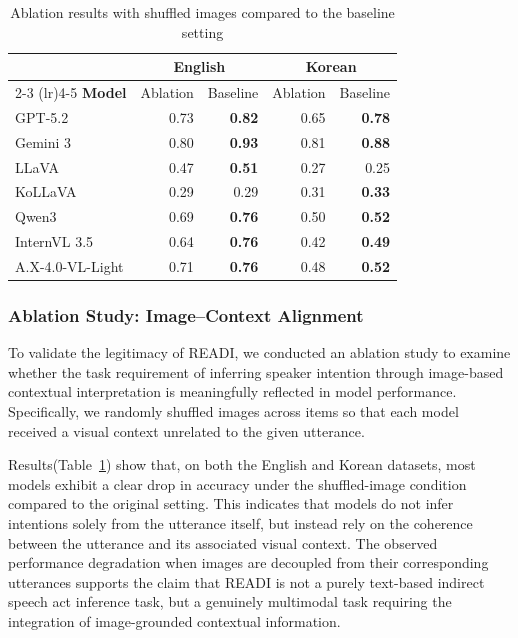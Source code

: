 \documentclass[11pt]{article}
\begin{document}
\begin{table}[t]
\centering
\small
\setlength{\tabcolsep}{3pt}          %
\renewcommand{\arraystretch}{0.95}
\begin{tabular}{p{2.4cm}rrrr}        %
\toprule
& \multicolumn{2}{c}{\textbf{English}} & \multicolumn{2}{c}{\textbf{Korean}} \\
\cmidrule(lr){2-3} \cmidrule(lr){4-5}
\textbf{Model} & Ablation & Baseline & Ablation & Baseline \\
\midrule
GPT-5.2               & 0.73 & \textbf{0.82} & 0.65 & \textbf{0.78} \\
Gemini 3             & 0.80 & \textbf{0.93} & 0.81 & \textbf{0.88} \\
LLaVA                & 0.47 & \textbf{0.51} & 0.27 & 0.25 \\
KoLLaVA              & 0.29 & 0.29           & 0.31 & \textbf{0.33} \\
Qwen3                & 0.69 & \textbf{0.76} & 0.50 & \textbf{0.52} \\
InternVL 3.5    & 0.64 & \textbf{0.76} & 0.42 & \textbf{0.49} \\
A.X-4.0-VL-Light  & 0.71 & \textbf{0.76} & 0.48 & \textbf{0.52} \\
\bottomrule
\end{tabular}
\caption{Ablation results with shuffled images compared to the baseline setting}
\label{tab:ablation_shuffle}
\end{table}

\subsubsection{Ablation Study: Image–Context Alignment}
To validate the legitimacy of READI, we conducted an ablation study to examine whether the task requirement of inferring speaker intention through image-based contextual interpretation is meaningfully reflected in model performance. Specifically, we randomly shuffled images across items so that each model received a visual context unrelated to the given utterance.

Results(Table~\ref{tab:ablation_shuffle}) show that, on both the English and Korean datasets, most models exhibit a clear drop in accuracy under the shuffled-image condition compared to the original setting. This indicates that models do not infer intentions solely from the utterance itself, but instead rely on the coherence between the utterance and its associated visual context. The observed performance degradation when images are decoupled from their corresponding utterances supports the claim that READI is not a purely text-based indirect speech act inference task, but a genuinely multimodal task requiring the integration of image-grounded contextual information.
\end{document}
